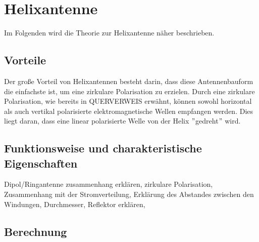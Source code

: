 \section{Helixantenne}
Im Folgenden wird die Theorie zur Helixantenne näher beschrieben.

\subsection{Vorteile}
Der große Vorteil von Helixantennen besteht darin, dass diese Antennenbauform die einfachste ist, um eine zirkulare Polarisation zu erzielen. Durch eine zirkulare Polarisation, wie bereits in QUERVERWEIS erwähnt, können sowohl horizontal als auch vertikal polarisierte elektromagnetische Wellen empfangen werden. Dies liegt daran, dass eine linear polarisierte Welle von der Helix $"$gedreht$"$ wird.

\subsection{Funktionsweise und charakteristische Eigenschaften}
Dipol/Ringantenne zusammenhang erklären, zirkulare Polarisation, Zusammenhang mit der Stromverteilung, Erklärung des Abstandes zwischen den Windungen, Durchmesser, Reflektor erklären,

\subsection{Berechnung}